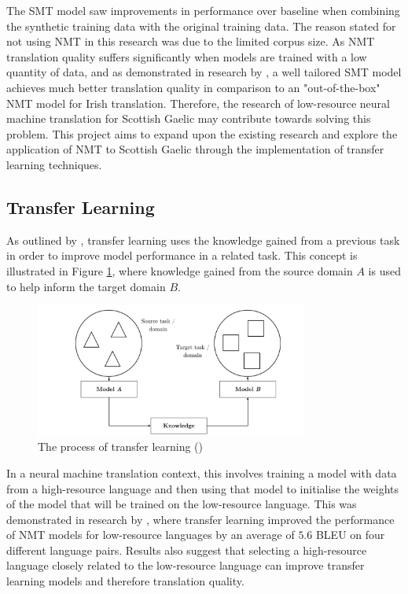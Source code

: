 The \acrshort{SMT} model saw improvements in performance over baseline when combining the synthetic training data with the original training data. The reason stated for not using \acrshort{NMT} in this research was due to the limited corpus size. As \acrshort{NMT} translation quality suffers significantly when models are trained with a low quantity of data, and as demonstrated in research by \cite{dowling_smt_2018}, a well tailored \acrshort{SMT} model achieves much better translation quality in comparison to an "out-of-the-box" \acrshort{NMT} model for Irish translation. Therefore, the research of low-resource neural machine translation for Scottish Gaelic may contribute towards solving this problem. This project aims to expand upon the existing research and explore the application of \acrshort{NMT} to Scottish Gaelic through the implementation of transfer learning techniques.

\subsection{Transfer Learning}
\label{sec:2-transfer_learning}
As outlined by \cite{torrey_transfer_2009}, transfer learning uses the knowledge gained from a previous task in order to improve model performance in a related task. This concept is illustrated in Figure \ref{fig:transfer}, where knowledge gained from the source domain $A$ is used to help inform the target domain $B$.

\begin{figure}[ht!]
\centering
\includegraphics[width=0.8\textwidth]{media/literature/nmt_approaches/transfer.png}
\caption[Diagram of the transfer learning process]{The process of transfer learning (\cite{ruder_transfer_2019})}
\label{fig:transfer}
\end{figure}


In a neural machine translation context, this involves training a model with data from a high-resource language and then using that model to initialise the weights of the model that will be trained on the low-resource language.
This was demonstrated in research by \cite{zoph_transfer_2016}, where transfer learning improved the performance of \acrshort{NMT} models for low-resource languages by an average of $5.6$ \acrshort{BLEU} on four different language pairs. Results also suggest that selecting a high-resource language closely related to the low-resource language can improve transfer learning models and therefore translation quality.

